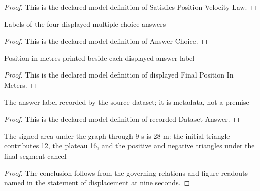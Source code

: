 \begin{proof}
  This is the declared model definition of Satisfies Position Velocity Law.
\end{proof}
\begin{definition}
  \label{def:physics:phyx-mini-0671:phyxminiproblems-problemphyxmini0671-answerchoice}
  Labels of the four displayed multiple-choice answers
\end{definition}
\begin{proof}
  This is the declared model definition of Answer Choice.
\end{proof}
\begin{definition}
  \label{def:physics:phyx-mini-0671:phyxminiproblems-problemphyxmini0671-displayedfinalpositioninmeters}
  Position in metres printed beside each displayed answer label
\end{definition}
\begin{proof}
  This is the declared model definition of displayed Final Position In Meters.
\end{proof}
\begin{definition}
  \label{def:physics:phyx-mini-0671:phyxminiproblems-problemphyxmini0671-recordeddatasetanswer}
  The answer label recorded by the source dataset; it is metadata, not a premise
\end{definition}
\begin{proof}
  This is the declared model definition of recorded Dataset Answer.
\end{proof}
\begin{lemma}
  \label{lem:physics:phyx-mini-0671:phyxminiproblems-problemphyxmini0671-displacement-at-nine-seconds}
  The signed area under the graph through 9 s is 28 m: the initial triangle contributes 12, the plateau 16, and the positive and negative triangles under the final segment cancel
\end{lemma}
\begin{proof}
  The conclusion follows from the governing relations and figure readouts named in the statement of displacement at nine seconds.
\end{proof}
